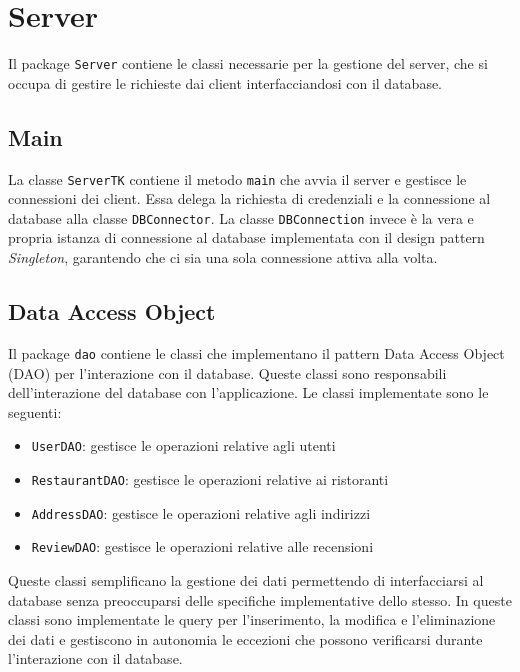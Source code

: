 \section{Server}
Il package \texttt{Server} contiene le classi necessarie per 
la gestione del server, che si occupa di gestire le richieste 
dai client interfacciandosi con il database.

\subsection{Main}
La classe \texttt{ServerTK} contiene il metodo \texttt{main} 
che avvia il server e gestisce le connessioni dei client.
Essa delega la richiesta di credenziali e la connessione al 
database alla classe \texttt{DBConnector}.
La classe \texttt{DBConnection} invece è la vera e propria 
istanza di connessione al database implementata con il design
pattern \textit{Singleton}, garantendo che ci sia una sola connessione
attiva alla volta.

\subsection{Data Access Object}
Il package \texttt{dao} contiene le classi che implementano 
il pattern Data Access Object (DAO) per l'interazione
con il database. Queste classi sono responsabili dell'interazione 
del database con l'applicazione.
Le classi implementate sono le seguenti:
\begin{itemize}
    \item \texttt{UserDAO}: gestisce le operazioni relative agli utenti
    \item \texttt{RestaurantDAO}: gestisce le operazioni relative ai ristoranti
    \item \texttt{AddressDAO}: gestisce le operazioni relative agli indirizzi
    \item \texttt{ReviewDAO}: gestisce le operazioni relative alle recensioni
\end{itemize}
Queste classi semplificano la gestione dei dati permettendo 
di interfacciarsi al database senza preoccuparsi delle specifiche
implementative dello stesso. 
In queste classi sono implementate le query per l'inserimento, 
la modifica e l'eliminazione dei dati e gestiscono in autonomia 
le eccezioni che possono verificarsi durante l'interazione
con il database.

